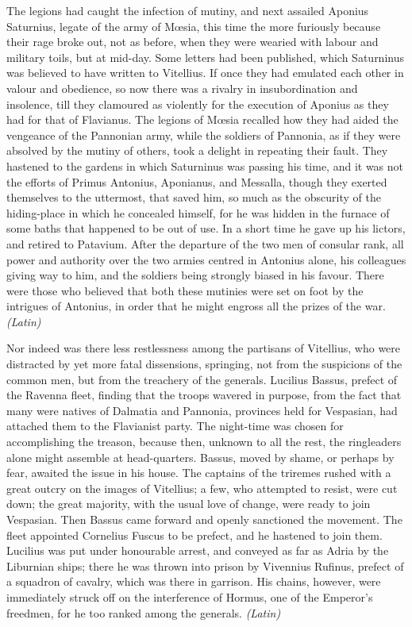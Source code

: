 The legions had caught the infection of mutiny, and next assailed Aponius Saturnius, legate of the army of Mœsia, this time the more furiously because their rage broke out, not as before, when they were wearied with labour and military toils, but at mid-day. Some letters had been published, which Saturninus was believed to have written to Vitellius. If once they had emulated each other in valour and obedience, so now there was a rivalry in insubordination and insolence, till they clamoured as violently for the execution of Aponius as they had for that of Flavianus. The legions of Mœsia recalled how they had aided the vengeance of the Pannonian army, while the soldiers of Pannonia, as if they were absolved by the mutiny of others, took a delight in repeating their fault. They hastened to the gardens in which Saturninus was passing his time, and it was not the efforts of Primus Antonius, Aponianus, and Messalla, though they exerted themselves to the uttermost, that saved him, so much as the obscurity of the hiding-place in which he concealed himself, for he was hidden in the furnace of some baths that happened to be out of use. In a short time he gave up his lictors, and retired to Patavium. After the departure of the two men of consular rank, all power and authority over the two armies centred in Antonius alone, his colleagues giving way to him, and the soldiers being strongly biased in his favour. There were those who believed that both these mutinies were set on foot by the intrigues of Antonius, in order that he might engross all the prizes of the war. \emph{(Latin)}


Nor indeed was there less restlessness among the partisans of Vitellius, who were distracted by yet more fatal dissensions, springing, not from the suspicions of the common men, but from the treachery of the generals. Lucilius Bassus, prefect of the Ravenna fleet, finding that the troops wavered in purpose, from the fact that many were natives of Dalmatia and Pannonia, provinces held for Vespasian, had attached them to the Flavianist party. The night-time was chosen for accomplishing the treason, because then, unknown to all the rest, the ringleaders alone might assemble at head-quarters. Bassus, moved by shame, or perhaps by fear, awaited the issue in his house. The captains of the triremes rushed with a great outcry on the images of Vitellius; a few, who attempted to resist, were cut down; the great majority, with the usual love of change, were ready to join Vespasian. Then Bassus came forward and openly sanctioned the movement. The fleet appointed Cornelius Fuscus to be prefect, and he hastened to join them. Lucilius was put under honourable arrest, and conveyed as far as Adria by the Liburnian ships; there he was thrown into prison by Vivennius Rufinus, prefect of a squadron of cavalry, which was there in garrison. His chains, however, were immediately struck off on the interference of Hormus, one of the Emperor's freedmen, for he too ranked among the generals. \emph{(Latin)}

